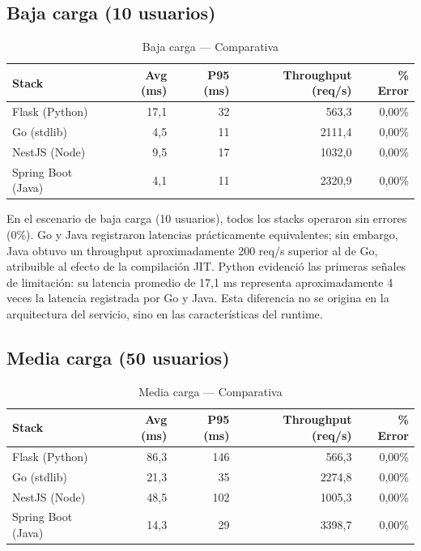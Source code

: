\documentclass[12pt,a4paper]{article}
\begin{document}
\subsection{Baja carga (10 usuarios)}

\begin{table}[h]
\centering
\small
\begin{tabular}{lrrrr}
\toprule
\textbf{Stack} & \textbf{Avg (ms)} & \textbf{P95 (ms)} & \textbf{Throughput (req/s)} & \textbf{\% Error} \\
\midrule
Flask (Python)     & 17,1 & 32 & 563,3  & 0,00\% \\
Go (stdlib)        & 4,5  & 11 & 2111,4 & 0,00\% \\
NestJS (Node)      & 9,5  & 17 & 1032,0 & 0,00\% \\
Spring Boot (Java) & 4,1  & 11 & 2320,9 & 0,00\% \\
\bottomrule
\end{tabular}
\caption{Baja carga --- Comparativa}
\end{table}

En el escenario de baja carga (10 usuarios), todos los stacks operaron sin errores (0\%). Go y Java registraron latencias prácticamente equivalentes; sin embargo, Java obtuvo un throughput aproximadamente 200 req/s superior al de Go, atribuible al efecto de la compilación JIT. Python evidenció las primeras señales de limitación: su latencia promedio de 17,1 ms representa aproximadamente 4 veces la latencia registrada por Go y Java. Esta diferencia no se origina en la arquitectura del servicio, sino en las características del runtime.

\subsection{Media carga (50 usuarios)}

\begin{table}[h]
\centering
\small
\begin{tabular}{lrrrr}
\toprule
\textbf{Stack} & \textbf{Avg (ms)} & \textbf{P95 (ms)} & \textbf{Throughput (req/s)} & \textbf{\% Error} \\
\midrule
Flask (Python)     & 86,3 & 146 & 566,3  & 0,00\% \\
Go (stdlib)        & 21,3 & 35  & 2274,8 & 0,00\% \\
NestJS (Node)      & 48,5 & 102 & 1005,3 & 0,00\% \\
Spring Boot (Java) & 14,3 & 29  & 3398,7 & 0,00\% \\
\bottomrule
\end{tabular}
\caption{Media carga --- Comparativa}
\end{table}
\end{document}
